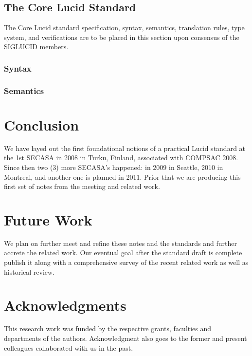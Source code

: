 \documentclass{easychair}
\newcommand{\todo}[0]
{
	{\Large }
}
\begin{document}
\subsection{The Core Lucid Standard}
\label{sect:core-lucid-spec}

The Core Lucid standard specification, syntax, semantics, translation rules,
type system, and verifications are to be placed in this section upon consensus of
the SIGLUCID members.

{\todo}

\subsubsection{Syntax}
\label{sect:core-lucid-syntax}
{\todo}

\subsubsection{Semantics}
\label{sect:core-lucid-semantics}
{\todo}

\section{Conclusion}
\label{sect:conclusion}

We have layed out the first foundational notions of a practical Lucid
standard at the 1st SECASA in 2008 in Turku, Finland, associated with
COMPSAC 2008. Since then two (3) more SECASA's happened: in 2009 in Seattle,
2010 in Montreal, and another one is planned in 2011. Prior that we
are producing this first set of notes from the meeting and related work.



\section{Future Work}
\label{sect:future-work}

We plan on further
meet and refine these notes and the standards and further accrete the
related work. Our eventual goal after the standard draft is complete 
publish it along with a comprehensive survey of the recent related work
as well as historical review.



\section{Acknowledgments}

This research work was funded by the respective grants, faculties
and departments of the authors.
Acknowledgment also goes to the former and present colleagues
collaborated with us in the past.



\label{sect:bib}


\printindex
\end{document}
